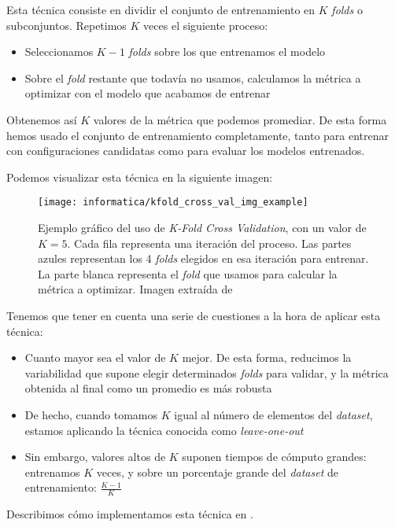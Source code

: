 Esta técnica consiste en dividir el conjunto de entrenamiento en $K$ \textit{folds} o subconjuntos. Repetimos $K$ veces el siguiente proceso:

\begin{itemize}
    \item Seleccionamos $K-1$ \textit{folds} sobre los que entrenamos el modelo
    \item Sobre el \textit{fold} restante que todavía no usamos, calculamos la métrica a optimizar con el modelo que acabamos de entrenar
\end{itemize}

Obtenemos así $K$ valores de la métrica que podemos promediar. De esta forma hemos usado el conjunto de entrenamiento completamente, tanto para entrenar con configuraciones candidatas como para evaluar los modelos entrenados.

Podemos visualizar esta técnica en la siguiente imagen:

\begin{figure}[H]
    \centering
    \texttt{[image: informatica/kfold\_cross\_val\_img\_example]}
    \caption{Ejemplo gráfico del uso de \textit{K-Fold Cross Validation}, con un valor de $K = 5$. Cada fila representa una iteración del proceso. Las partes azules representan los 4 \textit{folds} elegidos en esa iteración para entrenar. La parte blanca representa el \textit{fold} que usamos para calcular la métrica a optimizar. Imagen extraída de \cite{informatica:kfold_cross_val_img_web}}
\end{figure}

Tenemos que tener en cuenta una serie de cuestiones a la hora de aplicar esta técnica:

\begin{itemize}
    \item Cuanto mayor sea el valor de $K$ mejor. De esta forma, reducimos la variabilidad que supone elegir determinados \textit{folds} para validar, y la métrica obtenida al final como un promedio es más robusta
    \item De hecho, cuando tomamos $K$ igual al número de elementos del \textit{dataset}, estamos aplicando la técnica conocida como \textit{leave-one-out} \cite{informatica:kfold_cross_val_paper}
    \item Sin embargo, valores altos de $K$ suponen tiempos de cómputo grandes: entrenamos $K$ veces, y sobre un porcentaje grande del \textit{dataset} de entrenamiento: $\frac{K - 1}{K}$
\end{itemize}

Describimos cómo implementamos esta técnica en .
